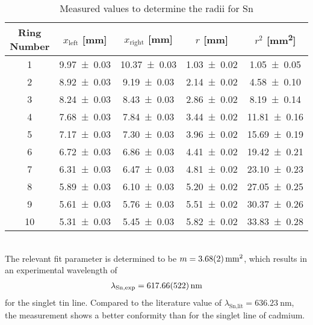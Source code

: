 \begin{table}[ht]
	\centering
	\begin{tabular}{c c c c c}
	Ring Number		& $x_\text{left}$ [\si{\mm}]	& $x_\text{right}$ [\si{\mm}]	& $r$ [\si{\mm}]		& $r^2$ [\si{\mm\squared}]	\\
	\hline
	1			& \num{9.97 \pm 0.03} 		& \num{10.37 \pm 0.03} 		& \num{1.03 \pm 0.02} 		& \num{1.05 \pm 0.05} \\
	2			& \num{8.92 \pm 0.03} 		& \num{9.19 \pm 0.03} 		& \num{2.14 \pm 0.02} 		& \num{4.58 \pm 0.10} \\
	3			& \num{8.24 \pm 0.03} 		& \num{8.43 \pm 0.03} 		& \num{2.86 \pm 0.02} 		& \num{8.19 \pm 0.14} \\
	4			& \num{7.68 \pm 0.03} 		& \num{7.84 \pm 0.03} 		& \num{3.44 \pm 0.02} 		& \num{11.81 \pm 0.16} \\
	5			& \num{7.17 \pm 0.03} 		& \num{7.30 \pm 0.03} 		& \num{3.96 \pm 0.02} 		& \num{15.69 \pm 0.19} \\
	6			& \num{6.72 \pm 0.03} 		& \num{6.86 \pm 0.03} 		& \num{4.41 \pm 0.02} 		& \num{19.42 \pm 0.21} \\
	7			& \num{6.31 \pm 0.03} 		& \num{6.47 \pm 0.03} 		& \num{4.81 \pm 0.02} 		& \num{23.10 \pm 0.23} \\
	8			& \num{5.89 \pm 0.03} 		& \num{6.10 \pm 0.03} 		& \num{5.20 \pm 0.02} 		& \num{27.05 \pm 0.25} \\
	9			& \num{5.61 \pm 0.03} 		& \num{5.76 \pm 0.03} 		& \num{5.51 \pm 0.02} 		& \num{30.37 \pm 0.26} \\
	10			& \num{5.31 \pm 0.03} 		& \num{5.45 \pm 0.03} 		& \num{5.82 \pm 0.02} 		& \num{33.83 \pm 0.28} \\
	\end{tabular}
	\caption[Measurement - Ring Positions Sn]{Measured values to determine the radii for Sn}
	\label{tab:SnRings}
\end{table}\\
The relevant fit parameter is determined to be $m = \SI{3.68 \pm 0.02}{\mm\squared}$, which results in an experimental wavelength of
\begin{align}
	\lambda_\text{Sn,exp} = \SI{617.66 \pm 5.22}{\nm}
\end{align}
for the singlet tin line. 
Compared to the literature value of $\lambda_\text{Sn,lit} = \SI{636.23}{\nm}$, the measurement shows a better conformity than for the singlet line of cadmium. 
